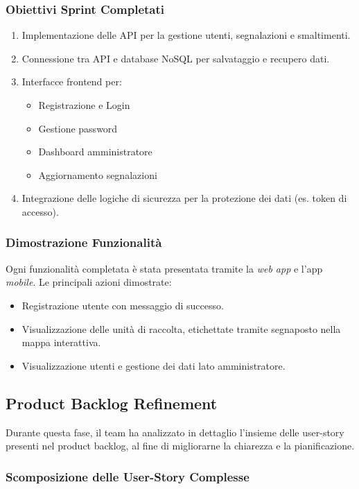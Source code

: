 \subsubsection{Obiettivi Sprint Completati}
\begin{enumerate}
  \item Implementazione delle API per la gestione utenti, segnalazioni e smaltimenti.
  \item Connessione tra API e database NoSQL per salvataggio e recupero dati.
  \item Interfacce frontend per:
  \begin{itemize}
    \item Registrazione e Login
    \item Gestione password
    \item Dashboard amministratore
    \item Aggiornamento segnalazioni
  \end{itemize}
  \item Integrazione delle logiche di sicurezza per la protezione dei dati (es. token di accesso).
\end{enumerate}

\subsubsection{Dimostrazione Funzionalità}
Ogni funzionalità completata è stata presentata tramite la \textit{web app} e l’app \textit{mobile}. Le principali azioni dimostrate:
\begin{itemize}
  \item Registrazione utente con messaggio di successo.
  \item Visualizzazione delle unità di raccolta, etichettate tramite segnaposto nella mappa interattiva.
  \item Visualizzazione utenti e gestione dei dati lato amministratore.
\end{itemize}

\subsection{Product Backlog Refinement}
Durante questa fase, il team ha analizzato in dettaglio l’insieme delle user-story presenti nel product backlog, al fine di migliorarne la chiarezza e la pianificazione.

\subsubsection{Scomposizione delle User-Story Complesse}

